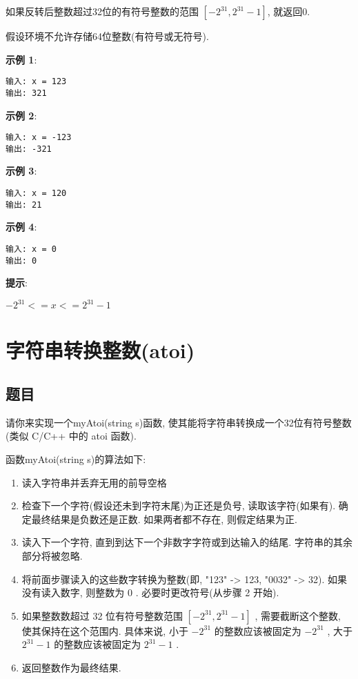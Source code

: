 \documentclass[oneside]{ctexbook}
\begin{document}
如果反转后整数超过32位的有符号整数的范围 $[-2^{31},  2^{31} - 1]$, 就返回0.

假设环境不允许存储64位整数(有符号或无符号).

\textbf{示例 1}:

\begin{verbatim}
输入: x = 123
输出: 321
\end{verbatim}

\textbf{示例 2}:

\begin{verbatim}
输入: x = -123
输出: -321
\end{verbatim}

\textbf{示例 3}:

\begin{verbatim}
输入: x = 120
输出: 21
\end{verbatim}

\textbf{示例 4}:

\begin{verbatim}
输入: x = 0
输出: 0
\end{verbatim}

\textbf{提示}:

$-2^{31} <= x <= 2^{31} - 1$

\chapter{字符串转换整数(atoi)}

\section{题目}

请你来实现一个myAtoi(string s)函数, 使其能将字符串转换成一个32位有符号整数(类似 C/C++ 中的 atoi 函数). 

函数myAtoi(string s)的算法如下: 

\begin{enumerate}
    \item 读入字符串并丢弃无用的前导空格
    \item 检查下一个字符(假设还未到字符末尾)为正还是负号, 读取该字符(如果有).  确定最终结果是负数还是正数.  如果两者都不存在, 则假定结果为正. 
    \item 读入下一个字符, 直到到达下一个非数字字符或到达输入的结尾. 字符串的其余部分将被忽略. 
    \item 将前面步骤读入的这些数字转换为整数(即, "123" -> 123,  "0032" -> 32). 如果没有读入数字, 则整数为 0 . 必要时更改符号(从步骤 2 开始). 
    \item 如果整数数超过 32 位有符号整数范围 $[-2^{31},  2^{31} - 1]$ , 需要截断这个整数, 使其保持在这个范围内. 具体来说, 小于 $-2^{31}$ 的整数应该被固定为 $-2^{31}$ , 大于 $2^{31} − 1$ 的整数应该被固定为 $2^{31} − 1$ . 
    \item 返回整数作为最终结果. 
\end{enumerate}
\end{document}
